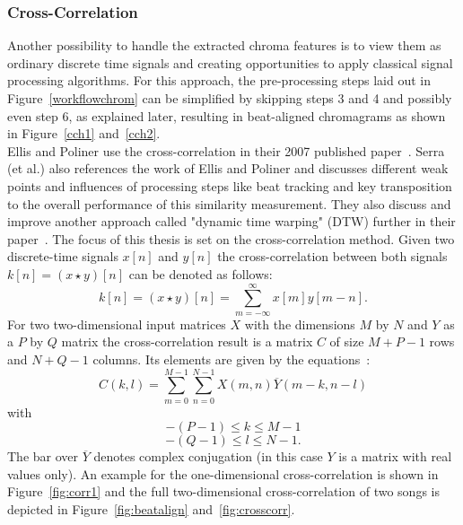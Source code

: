 \subsubsection{Cross-Correlation}\label{crosscorrsec}

Another possibility to handle the extracted chroma features is to view them as ordinary discrete time signals and creating opportunities to apply classical signal processing algorithms. For this approach, the pre-processing steps laid out in Figure~\ref{workflowchrom} can be simplified by skipping steps 3 and 4 and possibly even step 6, as explained later, resulting in beat-aligned chromagrams as shown in Figure~\ref{cch1} and~\ref{cch2}.\\
Ellis and Poliner use the cross-correlation in their 2007 published paper~\cite{chroma3}. Serra (et al.) also references the work of Ellis and Poliner and discusses different weak points and influences of processing steps like beat tracking and key transposition to the overall performance of this similarity measurement. 
They also discuss and improve another approach called "dynamic time warping" (DTW) further in their paper~\cite{chroma2}. The focus of this thesis is set on the cross-correlation method. 
Given two discrete-time signals $x[n]$ and $y[n]$ the cross-correlation between both signals $k[n] = (x \star y)[n]$ can be denoted as follows:
\begin{equation} \label{eq:conv1}
k[n] = (x \star y)[n] = \sum_{m = -\infty}^{\infty}{x[m] y[m - n]}.
\end{equation}
For two two-dimensional input matrices $X$ with the dimensions $M$ by $N$ and $Y$ as a $P$ by $Q$ matrix the cross-correlation result is a matrix $C$ of size $M + P - 1$ rows and $N + Q - 1$ columns. Its elements are given by the equations~\cite{mathcorr}:
\begin{equation} \label{eq:conv2}
C(k, l) = \sum_{m = 0}^{M - 1}{\sum_{n = 0}^{N - 1}{X(m, n)\overline{Y}(m - k, n - l)}}
\end{equation}
with 
\begin{equation} \label{eq:conv3}
-(P - 1) \leq k \leq M - 1
\end{equation}
\begin{equation} \label{eq:conv4}
-(Q - 1) \leq l \leq N - 1.
\end{equation}
The bar over $\overline{Y}$ denotes complex conjugation (in this case $Y$ is a matrix with real values only). 
An example for the one-dimensional cross-correlation is shown in Figure~\ref{fig:corr1} and the full two-dimensional cross-correlation of two songs is depicted in Figure~\ref{fig:beatalign} and~\ref{fig:crosscorr}.
